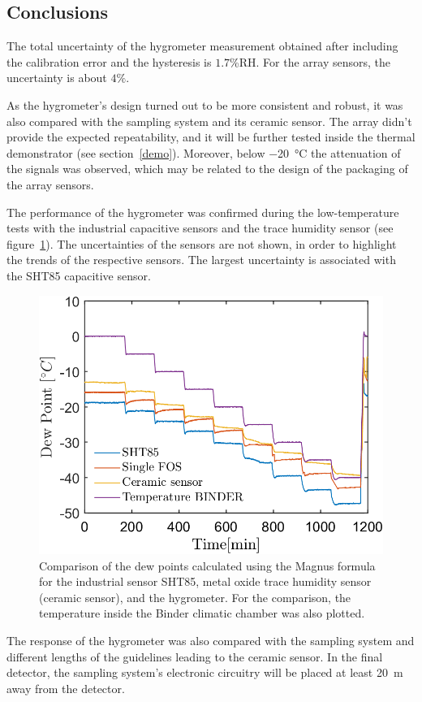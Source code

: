 \subsection{Conclusions}
The total uncertainty of the hygrometer measurement obtained after including the calibration error and the hysteresis is $1.7$\%RH. For the array sensors, the uncertainty is about $4\%$.


As the hygrometer's design turned out to be more consistent and robust, it was also compared with the sampling system and its ceramic sensor. The array didn't provide the expected repeatability, and it  will be further tested inside the thermal demonstrator (see section~\ref{demo}). Moreover, below \SI{-20}{\celsius} the attenuation of the signals was observed, which may be related to the design of the packaging of the array sensors.

The performance of the hygrometer was confirmed during the low-temperature tests with the industrial capacitive sensors and the trace humidity sensor (see figure~\ref{fig_comparison}). The uncertainties of the sensors are not shown, in order to highlight the trends of the respective sensors. The largest uncertainty is associated with the SHT85 capacitive sensor. 
\begin{figure}[!h]
\centering
\includegraphics[width=0.6\columnwidth]{Chapter5/images/DPCPercent.png}
\caption{Comparison of the dew points calculated using the Magnus formula for the industrial sensor SHT85, metal oxide trace humidity sensor (ceramic sensor), and the hygrometer. For the comparison, the temperature inside the Binder climatic chamber was also plotted.}
\label{fig_comparison}
\end{figure}

The response of the hygrometer was also compared with the sampling system and different lengths of the guidelines leading to the ceramic sensor. In the final detector, the sampling system's electronic circuitry will be placed at least \SI{20}{\metre} away from the detector. 

